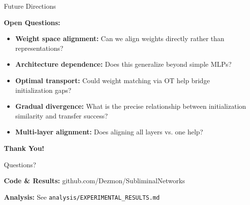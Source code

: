 \documentclass{beamer}
\begin{document}
\begin{frame}{Future Directions}

\textbf{Open Questions:}

\vspace{1em}

\begin{itemize}
    \item \textbf{Weight space alignment:} Can we align weights directly rather than representations?

    \vspace{0.5em}

    \item \textbf{Architecture dependence:} Does this generalize beyond simple MLPs?

    \vspace{0.5em}

    \item \textbf{Optimal transport:} Could weight matching via OT help bridge initialization gaps?

    \vspace{0.5em}

    \item \textbf{Gradual divergence:} What is the precise relationship between initialization similarity and transfer success?

    \vspace{0.5em}

    \item \textbf{Multi-layer alignment:} Does aligning all layers vs. one help?
\end{itemize}

\end{frame}

\begin{frame}[plain]
\centering
\Huge \textbf{Thank You!}

\vspace{2em}

\Large Questions?

\vspace{2em}

\normalsize
\textbf{Code \& Results:} github.com/Dezmon/SubliminalNetworks

\textbf{Analysis:} See \texttt{analysis/EXPERIMENTAL\_RESULTS.md}
\end{frame}

\end{document}
